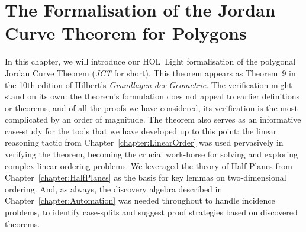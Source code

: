 \chapter{The Formalisation of the Jordan Curve Theorem for Polygons}\label{chapter:JordanFormalisation}

In this chapter, we will introduce our HOL~Light formalisation of the polygonal Jordan Curve Theorem (\emph{JCT} for short). This theorem appears as Theorem~9 in the 10th edition of Hilbert's \emph{Grundlagen der Geometrie}. The verification might stand on its own: the theorem's formulation does not appeal to earlier definitions or theorems, and of all the proofs we have considered, its verification is the most complicated by an order of magnitude. The theorem also serves as an informative case-study for the tools that we have developed up to this point: the linear reasoning tactic from Chapter~\ref{chapter:LinearOrder} was used pervasively in verifying the theorem, becoming the crucial work-horse for solving and exploring complex linear ordering problems. We leveraged the theory of Half-Planes from Chapter~\ref{chapter:HalfPlanes} as the basis for key lemmas on two-dimensional ordering. And, as always, the discovery algebra described in Chapter~\ref{chapter:Automation} was needed throughout to handle incidence problems, to identify case-splits and suggest proof strategies based on discovered theorems. 


